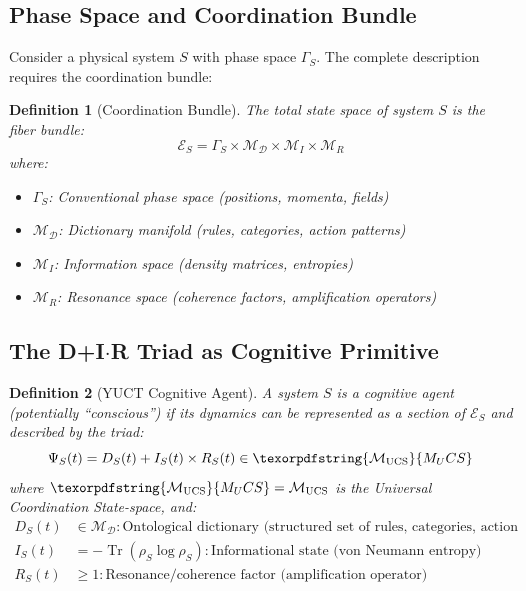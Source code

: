 \documentclass[12pt,a4paper]{article}
\newtheorem{definition}{Definition}
\DeclareMathOperator{\Tr}{Tr}
\DeclareRobustCommand{\UCS}{\texorpdfstring{\ensuremath{\mathcal{M}_{\mathrm{UCS}}}}{M_UCS}}
\newcommand{\Dict}{\mathcal{D}}
\newcommand{\Mdict}{\mathcal{M}_{\Dict}}
\begin{document}
	\subsection{Phase Space and Coordination Bundle}
	
	Consider a physical system \(S\) with phase space \(\Gamma_S\). The complete description requires the coordination bundle:
	
	\begin{definition}[Coordination Bundle]
		The total state space of system \(S\) is the fiber bundle:
		\[
		\mathcal{E}_S = \Gamma_S \times \Mdict \times \mathcal{M}_I \times \mathcal{M}_R
		\]
		where:
		\begin{itemize}
			\item \(\Gamma_S\): Conventional phase space (positions, momenta, fields)
			\item \(\Mdict\): Dictionary manifold (rules, categories, action patterns)
			\item \(\mathcal{M}_I\): Information space (density matrices, entropies)
			\item \(\mathcal{M}_R\): Resonance space (coherence factors, amplification operators)
		\end{itemize}
	\end{definition}
	
	\subsection{The D+I\(\cdot\)R Triad as Cognitive Primitive}
	
	\begin{definition}[YUCT Cognitive Agent]
		A system \(S\) is a cognitive agent (potentially ``conscious'') if its dynamics can be represented as a section of \(\mathcal{E}_S\) and described by the triad:
		\begin{equation}
			\label{eq:dir-triad}
			\Psi_S(t) = D_S(t) + I_S(t) \times R_S(t) \in \UCS
		\end{equation}
		where \(\UCS = \mathcal{M}_{\mathrm{UCS}}\) is the Universal Coordination State-space, and:
		\begin{align*}
			D_S(t) &\in \Mdict: \text{Ontological dictionary (structured set of rules, categories, action patterns)} \\
			I_S(t) &= -\Tr(\rho_S \log \rho_S): \text{Informational state (von Neumann entropy)} \\
			R_S(t) &\geq 1: \text{Resonance/coherence factor (amplification operator)}
		\end{align*}
	\end{definition}
	
\end{document}
